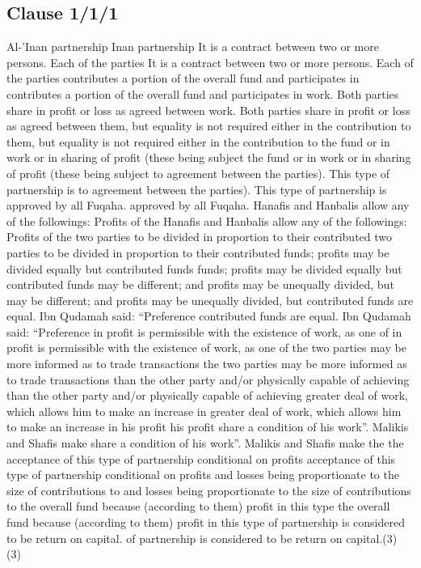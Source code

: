\documentclass{article}%
\begin{document}
%
\subsection{Clause 1/1/1}%
\label{subsec:Clause1/1/1}%
Al-’Inan partnership Inan partnership   It is a contract between two or more persons. Each of the parties    It is a contract between two or more persons. Each of the parties  contributes a portion of the overall fund and participates in  contributes a portion of the overall fund and participates in  work. Both parties share in profit or loss as agreed between  work. Both parties share in profit or loss as agreed between  them, but equality is not required either in the contribution to  them, but equality is not required either in the contribution to  the fund or in work or in sharing of profit (these being subject  the fund or in work or in sharing of profit (these being subject  to agreement between the parties). This type of partnership is  to agreement between the parties). This type of partnership is  approved by all Fuqaha. approved by all Fuqaha.   Hanafis and Hanbalis allow any of the followings: Profits of the    Hanafis and Hanbalis allow any of the followings: Profits of the  two parties to be divided in proportion to their contributed  two parties to be divided in proportion to their contributed  funds; profits may be divided equally but contributed funds  funds; profits may be divided equally but contributed funds  may be different; and profits may be unequally divided, but  may be different; and profits may be unequally divided, but  contributed funds are equal. Ibn Qudamah said: “Preference  contributed funds are equal. Ibn Qudamah said: “Preference  in profit is permissible with the existence of work, as one of  in profit is permissible with the existence of work, as one of  the two parties may be more informed as to trade transactions  the two parties may be more informed as to trade transactions  than the other party and/or physically capable of achieving  than the other party and/or physically capable of achieving  greater deal of work, which allows him to make an increase in  greater deal of work, which allows him to make an increase in  his profit  his profit share a condition of his work”. Malikis and Shafis make  share a condition of his work”. Malikis and Shafis make  the  the acceptance of this type of partnership conditional on profits  acceptance of this type of partnership conditional on profits  and losses being proportionate to the size of contributions to  and losses being proportionate to the size of contributions to  the overall fund because (according to them) profit in this type  the overall fund because (according to them) profit in this type  of partnership is considered to be return on capital. of partnership is considered to be return on capital.(3) (3)
\end{document}
